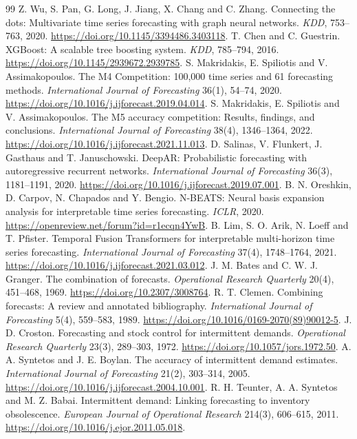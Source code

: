 \documentclass[11pt,a4paper]{article}
\begin{document}
\begin{thebibliography}{99}
 Z. Wu, S. Pan, G. Long, J. Jiang, X. Chang and C. Zhang. Connecting the dots: Multivariate time series forecasting with graph neural networks. \emph{KDD}, 753--763, 2020. \url{https://doi.org/10.1145/3394486.3403118}.
 T. Chen and C. Guestrin. XGBoost: A scalable tree boosting system. \emph{KDD}, 785--794, 2016. \url{https://doi.org/10.1145/2939672.2939785}.
 S. Makridakis, E. Spiliotis and V. Assimakopoulos. The M4 Competition: 100,000 time series and 61 forecasting methods. \emph{International Journal of Forecasting} 36(1), 54--74, 2020. \url{https://doi.org/10.1016/j.ijforecast.2019.04.014}.
 S. Makridakis, E. Spiliotis and V. Assimakopoulos. The M5 accuracy competition: Results, findings, and conclusions. \emph{International Journal of Forecasting} 38(4), 1346--1364, 2022. \url{https://doi.org/10.1016/j.ijforecast.2021.11.013}.
 D. Salinas, V. Flunkert, J. Gasthaus and T. Januschowski. DeepAR: Probabilistic forecasting with autoregressive recurrent networks. \emph{International Journal of Forecasting} 36(3), 1181--1191, 2020. \url{https://doi.org/10.1016/j.ijforecast.2019.07.001}.
 B. N. Oreshkin, D. Carpov, N. Chapados and Y. Bengio. N-BEATS: Neural basis expansion analysis for interpretable time series forecasting. \emph{ICLR}, 2020. \url{https://openreview.net/forum?id=r1ecqn4YwB}.
 B. Lim, S. O. Arik, N. Loeff and T. Pfister. Temporal Fusion Transformers for interpretable multi-horizon time series forecasting. \emph{International Journal of Forecasting} 37(4), 1748--1764, 2021. \url{https://doi.org/10.1016/j.ijforecast.2021.03.012}.
 J. M. Bates and C. W. J. Granger. The combination of forecasts. \emph{Operational Research Quarterly} 20(4), 451--468, 1969. \url{https://doi.org/10.2307/3008764}.
 R. T. Clemen. Combining forecasts: A review and annotated bibliography. \emph{International Journal of Forecasting} 5(4), 559--583, 1989. \url{https://doi.org/10.1016/0169-2070(89)90012-5}.
 J. D. Croston. Forecasting and stock control for intermittent demands. \emph{Operational Research Quarterly} 23(3), 289--303, 1972. \url{https://doi.org/10.1057/jors.1972.50}.
 A. A. Syntetos and J. E. Boylan. The accuracy of intermittent demand estimates. \emph{International Journal of Forecasting} 21(2), 303--314, 2005. \url{https://doi.org/10.1016/j.ijforecast.2004.10.001}.
 R. H. Teunter, A. A. Syntetos and M. Z. Babai. Intermittent demand: Linking forecasting to inventory obsolescence. \emph{European Journal of Operational Research} 214(3), 606--615, 2011. \url{https://doi.org/10.1016/j.ejor.2011.05.018}.

\end{thebibliography}
\end{document}
